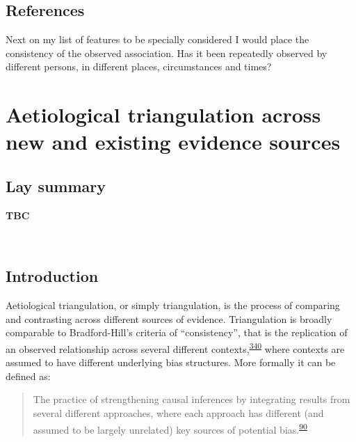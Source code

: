 \documentclass[a4paper, twoside]{templates/ociamthesis}
\begin{document}
\newpage

\hypertarget{references-5}{%
\section{References}\label{references-5}}

\begin{savequote}
Next on my list of features to be specially considered I would place the
consistency of the observed association. Has it been repeatedly observed
by different persons, in different places, circumstances and times?
\end{savequote}



\hypertarget{tri-heading}{%
\chapter{Aetiological triangulation across new and existing evidence sources}\label{tri-heading}}

\minitoc 

\hypertarget{lay-summary-6}{%
\section{Lay summary}\label{lay-summary-6}}

\textbf{TBC}

~

\newpage

\newpage

\hypertarget{triangulation-overview}{%
\section{Introduction}\label{triangulation-overview}}

Aetiological triangulation, or simply triangulation, is the process of comparing and contrasting across different sources of evidence. Triangulation is broadly comparable to Bradford-Hill's criteria of ``consistency'', that is the replication of an observed relationship across several different contexts,\textsuperscript{\protect\hyperlink{ref-hill1965}{340}} where contexts are assumed to have different underlying bias structures. More formally it can be defined as:

\begin{quote}
The practice of strengthening causal inferences by integrating results from several different approaches, where each approach has different (and assumed to be largely unrelated) key sources of potential bias.\textsuperscript{\protect\hyperlink{ref-lawlor2016}{90}}
\end{quote}
\end{document}
